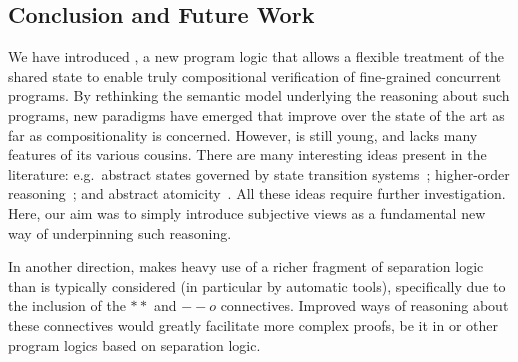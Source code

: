 \subsection*{Conclusion and Future Work}

We have introduced \colosl, a new program logic that allows a flexible
treatment of the shared state to enable truly compositional
verification of fine-grained concurrent programs. By rethinking the
semantic model underlying the reasoning about such programs, new
paradigms have emerged that improve over the state of the art as far
as compositionality is concerned. However, \colosl is still young, and
lacks many features of its various cousins.  There are many
interesting ideas present in the literature: e.g.\ abstract states
governed by state transition systems~\cite{caresl}; higher-order
reasoning~\cite{icap}; and abstract atomicity~\cite{tada}. All these
ideas require further investigation. Here, our aim was to simply
introduce subjective views as a fundamental new way of underpinning such reasoning.

In another direction, \colosl makes heavy use of a richer fragment
of separation logic than is typically considered (in particular by
automatic tools), specifically due to the inclusion of the $**$ and
$--o$ connectives. Improved ways of reasoning about these connectives
would greatly facilitate more complex proofs, be it in \colosl or
other program logics based on separation logic.
